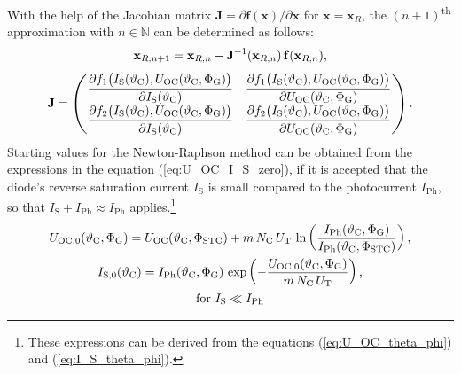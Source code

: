 With the help of the Jacobian matrix $\mathrm{\mathbf{J}} = \partial \mathrm{\mathbf{f}}(\mathrm{\mathbf{x}}) / \partial \mathrm{\mathbf{x}}$ for $\mathrm{\mathbf{x}} = \mathrm{\mathbf{x}}_R$, the $\left(n + 1\right)$\textsuperscript{th} approximation with $n \in \mathbb{N}$ can be determined as follows:
	\begin{equation} \label{eq:vect_U_I_approx}
	\centering
		\mathrm{\mathbf{x}}_{R, n + 1} = \mathrm{\mathbf{x}}_{R,n} 	- \mathrm{\mathbf{J}}^{-1}(\mathrm{\mathbf{x}}_{R,n}) \, \mathrm{\mathbf{f}}(\mathrm{\mathbf{x}}_{R,n}) \text{,}
	\end{equation}
	\begin{equation} \label{eq:jacobian_for_PVG}
	\centering
		\mathrm{\mathbf{J}} =  
 		\begin{pmatrix}
  			\dfrac{\partial f_1\big( I_\mathrm{S}(\vartheta_{\mathrm{C}}), U_\mathrm{OC}(\vartheta_{\mathrm{C}},\Phi_{\mathrm{G}}) \big)}{\partial I_\mathrm{S}(\vartheta_{\mathrm{C}})}  & \dfrac{\partial  f_1\big( I_\mathrm{S}(\vartheta_{\mathrm{C}}), U_\mathrm{OC}(\vartheta_{\mathrm{C}},\Phi_{\mathrm{G}}) \big)}{\partial U_\mathrm{OC}(\vartheta_{\mathrm{C}},\Phi_{\mathrm{G}})} \\
			\dfrac{\partial f_2\big( I_\mathrm{S}(\vartheta_{\mathrm{C}}), U_\mathrm{OC}(\vartheta_{\mathrm{C}},\Phi_{\mathrm{G}}) \big)}{\partial I_\mathrm{S}(\vartheta_{\mathrm{C}})} & \dfrac{\partial f_2\big( I_\mathrm{S}(\vartheta_{\mathrm{C}}), U_\mathrm{OC}(\vartheta_{\mathrm{C}},\Phi_{\mathrm{G}}) \big)}{\partial U_\mathrm{OC}(\vartheta_{\mathrm{C}},\Phi_{\mathrm{G}})} 
 		\end{pmatrix} \text{.}
 	\end{equation}
Starting values for the Newton-Raphson method can be obtained from the expressions in the equation (\ref{eq:U_OC_I_S_zero}), if it is accepted that the diode's reverse saturation current $I_{\mathrm{S}}$ is small compared to the photocurrent $I_{\mathrm{Ph}}$, so that $I_{\mathrm{S}} + I_{\mathrm{Ph}} \approx I_{\mathrm{Ph}}$ applies.\footnote{These expressions can be derived from the equations (\ref{eq:U_OC_theta_phi}) and (\ref{eq:I_S_theta_phi}).}
	\begin{equation} \label{eq:U_OC_I_S_zero}
	\centering
		\begin{gathered}
		 U_{\mathrm{OC,0}}(\vartheta_{\mathrm{C}}, \Phi_{\mathrm{G}}) = U_\mathrm{OC}(\vartheta_{\mathrm{C}},\Phi_\mathrm{STC}) + m \, N_\mathrm{C} \, U_\mathrm{T} \, \ln \left( \frac{I_\mathrm{Ph}(\vartheta_{\mathrm{C}}, \Phi_{\mathrm{G}})}{I_\mathrm{Ph}(\vartheta_{\mathrm{C}},\Phi_\mathrm{STC})} \right)\text{,} \\
		 I_\mathrm{S,0}(\vartheta_{\mathrm{C}}) = I_{\mathrm{Ph}}(\vartheta_{\mathrm{C}}, \Phi_{\mathrm{G}}) \, \exp \left( - \frac{U_\mathrm{OC,0}(\vartheta_{\mathrm{C}}, \Phi_{\mathrm{G}})}{m \, N_\mathrm{C} \, U_\mathrm{T}} \right)\text{,} \\ \text{for } I_\mathrm{S} \ll I_\mathrm{Ph}
		 \end{gathered}
	\end{equation}
